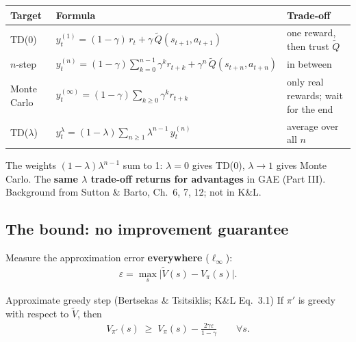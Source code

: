 \begin{center}
\small
\begin{tabular}{l l l}
\toprule
\textbf{Target} & \textbf{Formula} & \textbf{Trade-off} \\
\midrule
TD(0) & $y_t^{(1)} = (1-\gamma)\,r_t + \gamma\,\tilde Q(s_{t+1},a_{t+1})$ & one reward, then trust $\tilde Q$ \\
$n$-step & $y_t^{(n)} = (1-\gamma)\sum_{k=0}^{n-1}\gamma^k r_{t+k} + \gamma^n\,\tilde Q(s_{t+n},a_{t+n})$ & in between \\
Monte Carlo & $y_t^{(\infty)} = (1-\gamma)\sum_{k\ge0}\gamma^k r_{t+k}$ & only real rewards; wait for the end \\
TD($\lambda$) & $y_t^{\lambda} = (1-\lambda)\sum_{n\ge1}\lambda^{n-1}\,y_t^{(n)}$ & average over all $n$ \\
\bottomrule
\end{tabular}
\end{center}

\begin{notebox}
The weights $(1-\lambda)\lambda^{n-1}$ sum to 1: $\lambda=0$ gives TD(0), $\lambda\to1$ gives Monte Carlo. The \textbf{same $\lambda$ trade-off returns for advantages} in GAE (Part III). Background from Sutton \& Barto, Ch.~6, 7, 12; not in K\&L.
\end{notebox}

\subsection{The bound: no improvement guarantee}

Measure the approximation error \textbf{everywhere} ($\ell_\infty$):
\begin{gather*}
  \varepsilon = \max_s \big|\tilde V(s) - V_\pi(s)\big|.
\end{gather*}

\begin{thmbox}{Approximate greedy step (Bertsekas \& Tsitsiklis; K\&L Eq.~3.1)}
If $\pi'$ is greedy with respect to $\tilde V$, then
\begin{gather*}
  V_{\pi'}(s) \;\ge\; V_\pi(s) - \frac{2\gamma\varepsilon}{1-\gamma} \qquad \forall s.
\end{gather*}
\end{thmbox}

